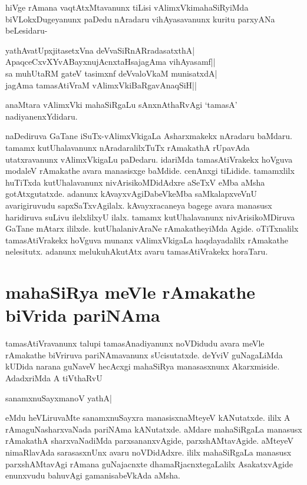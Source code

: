 hiVge rAmana vaqtAtxMtavanunx tiLisi vAlimxVkimahaSiRyiMda biVLokxDugeyanunx paDedu nAradaru vihAyasavanunx kuritu parxyANa beLesidaru- 

\begin{shloka}
yathAvatUpxjitasetxVna deVvaSiRnARradasatxthA|\label{197}\\
ApaqceCxvXYvABayxnujAcnxtaHsajagAma vihAyasamf||\\ 
sa muhUtaRM gateV tasimxnf deVvaloVkaM munisatxdA|\\ 
jagAma tamasAtiVraM vAlimxVkiBaRgavAnaqSiH||
\end{shloka}

anaMtara vAlimxVki mahaSiRgaLu sAnxnAthaRvAgi `tamasA' nadiyanenxYdidaru. 

naDediruva GaTane iSuTx-vAlimxVkigaLa Asharxmakekx nAradaru baMdaru. tamamx kutUhalavanunx nAradaralilxTuTx rAmakathA rUpavAda utatxravanunx vAlimxVkigaLu paDedaru. idariMda tamasAtiVrakekx hoVguva modaleV rAmakathe avara manasisxge baMdide. cenAnxgi tiLidide. tamamxlilx huTiTxda kutUhalavanunx nivArisikoMDidAdxre aSeTxV eMba aMsha gotAtxgutatxde. adanunx kAvayxvAgiDabeVkeMba saMkalapxveVnU avarigiruvudu sapxSaTxvAgilalx. kAvayxracaneya bagege avara manasusx haridiruva suLivu ilelxlilxyU ilalx. tamamx kutUhalavanunx nivArisikoMDiruva GaTane mAtarx ililxde. kutUhalanivAraNe rAmakatheyiMda Agide. oTiTxnalilx tamasAtiVrakekx hoVguva munanx vAlimxVkigaLa haqdayadalilx rAmakathe nelesitutx. adanunx melukuhAkutAtx avaru tamasAtiVrakekx horaTaru. 

\section*{mahaSiRya meVle rAmakathe biVrida pariNAma} 

tamasAtiVravanunx talupi tamasAnadiyanunx noVDidudu avara meVle rAmakathe biVriruva pariNAmavanunx sUcisutatxde. deYviV guNagaLiMda kUDida narana guNaveV hecAcxgi mahaSiRya manasasxnunx Akarxmiside. AdadxriMda A tiVthaRvU 

\begin{shloka} 
sanamxnuSayxmanoV yathA|\label{197a}
\end{shloka}

eMdu heVLiruvaMte sanamxnuSayxra manasisxnaMteyeV kANutatxde. ililx A rAmaguNasharxvaNada pariNAma kANutatxde. aMdare mahaSiRgaLa manasusx rAmakathA sharxvaNadiMda parxsananxvAgide, parxshAMtavAgide. aMteyeV nimaRlavAda sarasasxnUnx avaru noVDidAdxre. ililx mahaSiRgaLa manasusx parxshAMtavAgi rAmana guNajacnxte dhamaRjacnxtegaLalilx AsakatxvAgide enunxvudu bahuvAgi gamanisabeVkAda aMsha. 

